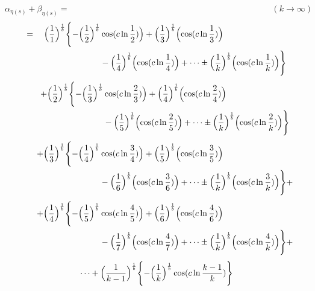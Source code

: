 \documentclass{amsart}
\begin{document}
	\[ \alpha_{\eta(s)} + \beta_{\eta(s)} = \qquad\qquad\qquad\qquad\qquad\qquad\qquad\qquad\qquad\qquad\qquad\qquad (k \to \infty) \]
	\[
	\begin{aligned}
		= \quad \Bigl( \frac{1}{1} \Bigr)^\frac1b \Biggl\{ -\Bigl( \frac{1}{2} \Bigr)^\frac1b &\cos(c \ln \frac{1}{2}) \Bigr) + \Bigl( \frac{1}{3} \Bigr)^\frac1b \Bigl( \cos(c \ln \frac{1}{3}) \Bigr) \\
		& -\Bigl( \frac{1}{4} \Bigr)^\frac1b \Bigl( \cos(c \ln \frac{1}{4}) \Bigr) + \dots \pm \Bigl( \frac{1}{k} \Bigr)^\frac1b \Bigl( \cos(c \ln \frac{1}{k}) \Bigr) \Biggr\} 
	\end{aligned}
	\]
	\[
	\begin{aligned}
		\quad\quad +\Bigl( \frac{1}{2} \Bigr)^\frac1b \Biggl\{ -\Bigl( \frac{1}{3} \Bigr)^\frac1b &\cos(c \ln \frac{2}{3}) \Bigr) + \Bigl( \frac{1}{4} \Bigr)^\frac1b \Bigl( \cos(c \ln \frac{2}{4}) \Bigr) \\
		& -\Bigl( \frac{1}{5} \Bigr)^\frac1b \Bigl( \cos(c \ln \frac{2}{5}) \Bigr) + \dots \pm \Bigl( \frac{1}{k} \Bigr)^\frac1b \Bigl( \cos(c \ln \frac{2}{k}) \Bigr) \Biggr\}
	\end{aligned}
	\]
	\[
	\begin{aligned}
		\quad\quad +\Bigl( \frac{1}{3} \Bigr)^\frac1b \Biggl\{ -\Bigl( \frac{1}{4} \Bigr)^\frac1b &\cos(c \ln \frac{3}{4}) \Bigr) + \Bigl( \frac{1}{5} \Bigr)^\frac1b \Bigl( \cos(c \ln \frac{3}{5}) \Bigr) \\
		& -\Bigl( \frac{1}{6} \Bigr)^\frac1b \Bigl( \cos(c \ln \frac{3}{6}) \Bigr) + \dots \pm \Bigl( \frac{1}{k} \Bigr)^\frac1b \Bigl( \cos(c \ln \frac{3}{k}) \Bigr) \Biggr\} + 
	\end{aligned}
	\]
	\[
	\begin{aligned}
		\quad\quad +\Bigl( \frac{1}{4} \Bigr)^\frac1b \Biggl\{ -\Bigl( \frac{1}{5} \Bigr)^\frac1b &\cos(c \ln \frac{4}{5}) \Bigr) + \Bigl( \frac{1}{6} \Bigr)^\frac1b \Bigl( \cos(c \ln \frac{4}{6}) \Bigr) \\
		& -\Bigl( \frac{1}{7} \Bigr)^\frac1b \Bigl( \cos(c \ln \frac{4}{7}) \Bigr) + \dots \pm \Bigl( \frac{1}{k} \Bigr)^\frac1b \Bigl( \cos(c \ln \frac{4}{k}) \Bigr) \Biggr\} + 
	\end{aligned}
	\]
	\[ \dots + \Bigl( \frac{1}{k-1} \Bigr)^\frac1b \Biggl\{ -\Bigl( \frac{1}{k} \Bigr)^\frac1b \cos(c \ln \frac{k-1}{k}) \Biggr\} \]
	
	
\end{document}
